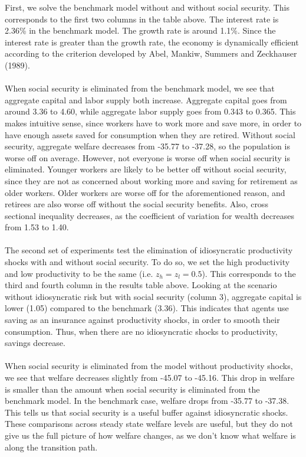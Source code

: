 \documentclass[12pt]{article}
\begin{document}
\noindent First, we solve the benchmark model without and without social security. This corresponds to the first two columns in the table above. The interest rate is 2.36\% in the benchmark model. The growth rate is around 1.1\%. Since the interest rate is greater than the growth rate, the economy is dynamically efficient according to the criterion developed by Abel, Mankiw, Summers and Zeckhauser (1989). \\\\
When social security is eliminated from the benchmark model, we see that aggregate capital and labor supply both increase. Aggregate capital goes from around 3.36 to 4.60, while aggregate labor supply goes from 0.343 to 0.365. This makes intuitive sense, since workers have to work more and save more, in order to have enough assets saved for consumption when they are retired. Without social security, aggregate welfare decreases from -35.77 to -37.28, so the population is worse off on average. However, not everyone is worse off when social security is eliminated. Younger workers are likely to be better off without social security, since they are not as concerned about working more and saving for retirement as older workers. Older workers are worse off for the aforementioned reason, and retirees are also worse off without the social security benefits. Also, cross sectional inequality decreases, as the coefficient of variation for wealth decreases from 1.53 to 1.40. \\\\
The second set of experiments test the elimination of idiosyncratic productivity shocks with and without social security. To do so, we set the high productivity and low productivity to be the same (i.e. $z_h = z_l = 0.5$). This corresponds to the third and fourth column in the results table above. Looking at the scenario without idiosyncratic risk but with social security (column 3), aggregate capital is lower (1.05) compared to the benchmark (3.36). This indicates that agents use saving as an insurance against productivity shocks, in order to smooth their consumption. Thus, when there are no idiosyncratic shocks to productivity, savings decrease. \\\\
When social security is eliminated from the model without productivity shocks, we see that welfare decreases slightly from -45.07 to -45.16. This drop in welfare is smaller than the amount when social security is eliminated from the benchmark model. In the benchmark case, welfare drops from -35.77 to -37.38. This tells us that social security is a useful buffer against idiosyncratic shocks. These comparisons across steady state welfare levels are useful, but they do not give us the full picture of how welfare changes, as we don't know what welfare is along the transition path. \\\\
\end{document}
